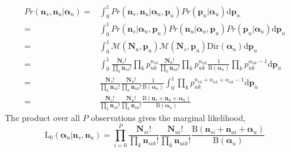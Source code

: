 \documentclass{article}
\begin{document}
\[
\begin{split}
Pr(\mathbf{n}_s,\mathbf{n}_u|\boldsymbol{\alpha}_u)=&\int_0^1Pr(\mathbf{n}_s,\mathbf{n}_u|\boldsymbol{\alpha}_u,\mathbf{p}_u)Pr(\mathbf{p}_u|\boldsymbol{\alpha}_u)\mathrm{d}\mathbf{p}_u\\
=&\int_0^1Pr(\mathbf{n}_s|\boldsymbol{\alpha}_u,\mathbf{p}_u)Pr(\mathbf{n}_u|\boldsymbol{\alpha}_u,\mathbf{p}_u)Pr(\mathbf{p}_u|\boldsymbol{\alpha}_u)\mathrm{d}\mathbf{p}_u\\
=&\int_0^1 \mathcal{M}(\mathbf{N}_u,\mathbf{p}_u)\mathcal{M}(\mathbf{N}_s,\mathbf{p}_u)\mathrm{Dir}(\boldsymbol{\alpha}_u)\mathrm{d}\mathbf{p}_u\\
=&\int_0^1 \frac{\mathbf{N}_s!}{\prod_k \mathbf{n}_{sk}!}\prod_k p^{n_{sk}}_{uk} \frac{\mathbf{N}_u!}{\prod_k \mathbf{n}_{uk}!}\prod_k p^{n_{uk}}_{uk}\frac{1}{\mathrm{B}(\boldsymbol{\alpha}_u)}\prod_k p_{uk}^{\alpha_{uk}-1}\mathrm{d}\mathbf{p}_u\\
=&\frac{\mathbf{N}_s!}{\prod_k \mathbf{n}_{sk}!}\frac{\mathbf{N}_u!}{\prod_k \mathbf{n}_{uk}!}\frac{1}{\mathrm{B}(\boldsymbol{\alpha}_u)}\int_0^1 \prod_k p^{n_{sk}+n_{uk}+\alpha_{uk}-1}_{uk}\mathrm{d}\mathbf{p}_u\\
=&\frac{\mathbf{N}_s!}{\prod_k \mathbf{n}_{sk}!}\frac{\mathbf{N}_u!}{\prod_k \mathbf{n}_{uk}!}\frac{\mathrm{B}(\mathbf{n}_s+\mathbf{n}_u+\boldsymbol{\alpha}_u)}{\mathrm{B}(\boldsymbol{\alpha}_u)}
\end{split}
\]
The product over all $P$ observations gives the marginal likelihood,
\[
\mathrm{L_0}(\boldsymbol{\alpha}_u|\mathbf{n}_s,\mathbf{n}_u)=\prod_{i=0}^P \frac{\mathbf{N}_{si}!}{\prod_k \mathbf{n}_{sik}!}\frac{\mathbf{N}_{ui}!}{\prod_k \mathbf{n}_{uik}!}\frac{\mathrm{B}(\mathbf{n}_{si}+\mathbf{n}_{ui}+\boldsymbol{\alpha}_{u})}{\mathrm{B}(\boldsymbol{\alpha}_{u})}
\]
\end{document}
